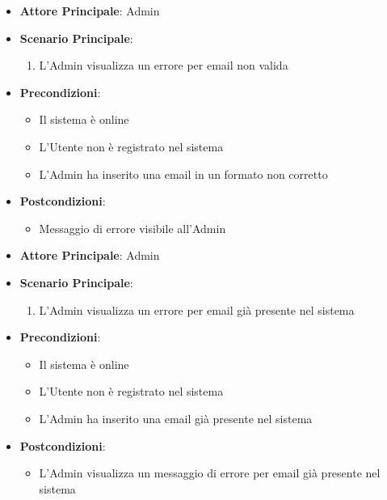 \label{uc_32.3.1}

\begin{itemize} 
    \item \textbf{Attore Principale}: Admin
    \item \textbf{Scenario Principale}:
    \begin{enumerate}
        \item L'Admin visualizza un errore per email non valida
    \end{enumerate}
    \item \textbf{Precondizioni}:
    \begin{itemize}
        \item Il sistema è online
        \item L'Utente non è registrato nel sistema
        \item L'Admin ha inserito una email in un formato non corretto
    \end{itemize}
    \item \textbf{Postcondizioni}:
    \begin{itemize}
        \item Messaggio di errore visibile all'Admin 
    \end{itemize}
\end{itemize}


\label{uc_32.3.2}

\begin{itemize}
    \item \textbf{Attore Principale}: Admin
    \item \textbf{Scenario Principale}:
    \begin{enumerate}
        \item L'Admin visualizza un errore per email già presente nel sistema
    \end{enumerate}
    \item \textbf{Precondizioni}:
    \begin{itemize}
        \item Il sistema è online
        \item L'Utente non è registrato nel sistema
        \item L'Admin ha inserito una email già presente nel sistema
    \end{itemize}
    \item \textbf{Postcondizioni}:
    \begin{itemize}
        \item L'Admin visualizza un messaggio di errore per email già presente nel sistema
    \end{itemize}
\end{itemize}